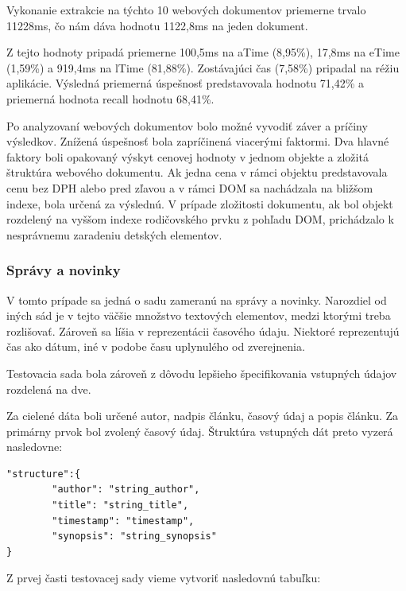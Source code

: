 Vykonanie extrakcie na týchto 10 webových dokumentov priemerne trvalo 11228ms, čo nám dáva hodnotu 1122,8ms na jeden dokument. 

Z tejto hodnoty pripadá priemerne 100,5ms na aTime (8,95\%), 17,8ms na eTime (1,59\%) a 919,4ms na lTime (81,88\%). Zostávajúci čas (7,58\%) pripadal na réžiu aplikácie. Výsledná priemerná úspešnosť predstavovala hodnotu 71,42\% a priemerná hodnota recall hodnotu 68,41\%. 

\bigskip

Po analyzovaní webových dokumentov bolo možné vyvodiť záver a príčiny výsledkov. Znížená úspešnosť bola zapríčinená viacerými faktormi. Dva hlavné faktory boli opakovaný výskyt cenovej hodnoty v jednom objekte a zložitá štruktúra webového dokumentu. Ak jedna cena v rámci objektu predstavovala cenu bez DPH alebo pred zľavou a v rámci DOM sa nachádzala na bližšom indexe, bola určená za výslednú. V prípade zložitosti dokumentu, ak bol objekt rozdelený na vyššom indexe rodičovského prvku z pohľadu DOM, prichádzalo k nesprávnemu zaradeniu detských elementov.

\newpage

\subsubsection{Správy a novinky}
\label{spravy}

V tomto prípade sa jedná o sadu zameranú na správy a novinky. Narozdiel od iných sád je v tejto väčšie množstvo textových elementov, medzi ktorými treba rozlišovať. Zároveň sa líšia v reprezentácii časového údaju. Niektoré reprezentujú čas ako dátum, iné v podobe času uplynulého od zverejnenia. 

Testovacia sada bola zároveň z dôvodu lepšieho špecifikovania vstupných údajov rozdelená na dve.

\bigskip

Za cielené dáta boli určené autor, nadpis článku, časový údaj a popis článku. Za primárny prvok bol zvolený časový údaj. Štruktúra vstupných dát preto vyzerá nasledovne:

\bigskip

\begin{lstlisting}
"structure":{
        "author": "string_author",
        "title": "string_title",
        "timestamp": "timestamp",
        "synopsis": "string_synopsis"
}
\end{lstlisting}

\bigskip

Z prvej časti testovacej sady vieme vytvoriť nasledovnú tabuľku:

